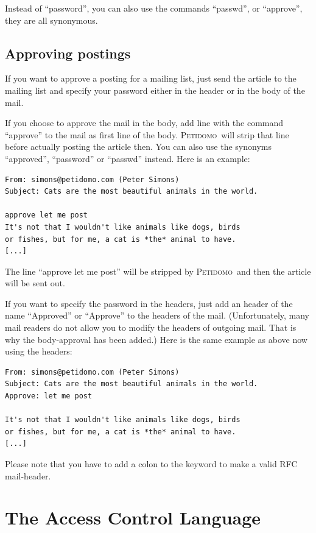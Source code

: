 \documentclass[a4paper]{report}
\newcommand{\Petidomo}{{\scshape Peti\-domo}}
\begin{document}
Instead of ``password'', you can also use the commands ``passwd'', or
``approve'', they are all synonymous.

\section{Approving postings}

If you want to approve a posting for a mailing list, just send the
article to the mailing list and specify your password either in the
header or in the body of the mail.

If you choose to approve the mail in the body, add line with the
command ``approve'' to the mail as first line of the body. \Petidomo\
will strip that line before actually posting the article then. You can
also use the synonyms ``approved'', ``password'' or ``passwd''
instead. Here is an example:
\begin{verbatim}
From: simons@petidomo.com (Peter Simons)
Subject: Cats are the most beautiful animals in the world.

approve let me post
It's not that I wouldn't like animals like dogs, birds
or fishes, but for me, a cat is *the* animal to have.
[...]
\end{verbatim}

The line ``approve let me post'' will be stripped by \Petidomo\ and
then the article will be sent out.

If you want to specify the password in the headers, just add an header
of the name ``Approved'' or ``Approve'' to the headers of the mail.
(Unfortunately, many mail readers do not allow you to modify the
headers of outgoing mail. That is why the body-approval has been
added.) Here is the same example as above now using the headers:
\begin{verbatim}
From: simons@petidomo.com (Peter Simons)
Subject: Cats are the most beautiful animals in the world.
Approve: let me post

It's not that I wouldn't like animals like dogs, birds
or fishes, but for me, a cat is *the* animal to have.
[...]
\end{verbatim}

Please note that you have to add a colon to the keyword to make a
valid RFC mail-header.


\chapter{The Access Control Language}
\end{document}
